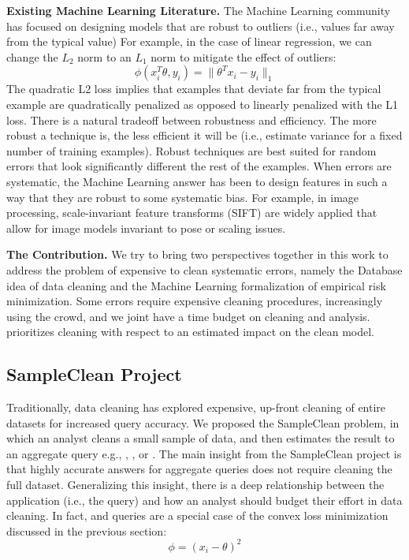 \vspace{0.5em}

\noindent\textbf{Existing  Machine Learning Literature. } The Machine Learning community has focused on
designing models that are robust to outliers (i.e., values far away from the typical value)
For example, in the case of linear regression, we can change the $L_2$ norm to an $L_1$ norm to mitigate the effect of outliers:
\[
\phi(x_{i}^T\theta,y_{i}) = \|\theta^Tx_{i} - y_i \|_1
\]
The quadratic L2 loss implies that examples that deviate far from the typical example are quadratically penalized as opposed to linearly penalized with the L1 loss.
There is a natural tradeoff between robustness and efficiency.
The more robust a technique is, the less efficient it will be (i.e., estimate variance for a fixed number of training examples).
Robust techniques are best suited for random errors that look significantly different the rest of the examples.
When errors are systematic, the Machine Learning answer has been to design features in such a way that they are robust to some systematic bias.
For example, in image processing, scale-invariant feature transforms (SIFT) are widely applied that allow for image models invariant to pose or scaling issues.

\vspace{0.5em}

\noindent\textbf{The \sys Contribution. } We try to bring two perspectives together in this work to address the problem of expensive to clean systematic errors, namely the Database idea of data cleaning and the Machine Learning formalization of empirical risk minimization.
Some errors require expensive cleaning procedures, increasingly using the crowd, and we joint have a time budget on cleaning and analysis.
\sys prioritizes cleaning with respect to an estimated impact on the clean model.

\subsection{SampleClean Project}

Traditionally, data cleaning has explored expensive, up-front cleaning of entire datasets for increased query accuracy.
We proposed the SampleClean problem, in which an analyst cleans a small sample of data, and then estimates the result to an aggregate query e.g., \sumfunc, \countfunc, or \avgfunc.
The main insight from the SampleClean project is that highly accurate answers for aggregate queries does not require cleaning the full dataset.
Generalizing this insight, there is a deep relationship between the application (i.e., the query) and how an analyst should budget their effort in data cleaning.
In fact, \avgfunc and \sumfunc queries are a special case of the convex loss minimization discussed in the previous section:
\[
\phi = (x_{i} - \theta)^2
\]

